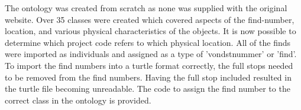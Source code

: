 The ontology was created from scratch as none was supplied with the original website. Over 35 classes were created which covered aspects of the find-number, location, and various physical characteristics of the objects. It is now possible to determine which project code refers to which physical location. All of the finds were imported as individuals and assigned as a type of 'vondstnummer' or 'find'. To import the find numbers into a turtle format correctly, the full stops needed to be removed from the find numbers. Having the full stop included resulted in the turtle file becoming unreadable. The code to assign the find number to the correct class in the ontology is provided.
